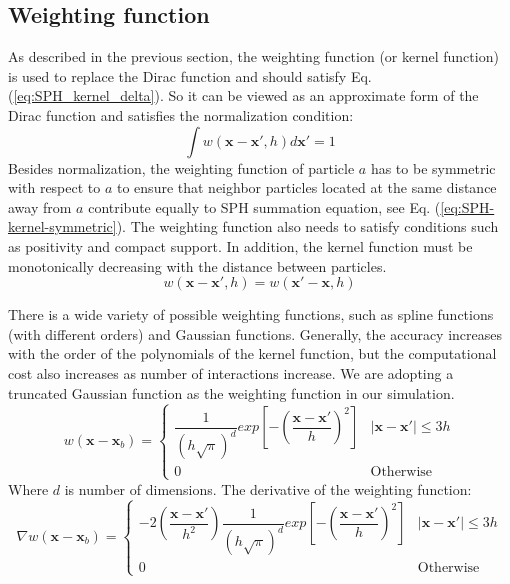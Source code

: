 \documentclass[journal abbreviation, manuscript]{copernicus}
\begin{document}
\subsection{Weighting function}
As described in the previous section, the weighting function (or kernel function) is used to replace the Dirac function and should satisfy Eq.  (\ref{eq:SPH_kernel_delta}). So it can be viewed as an approximate form of the Dirac function and satisfies the normalization condition:
\begin{equation}
\int	 w\left(\textbf{x}-\textbf{x}\prime, h\right) d\textbf{x}\prime = 1
\label{eq:SPH-kernel-normalization-prop}
\end{equation}
Besides normalization, the weighting function of particle $a$ has to be symmetric with respect to $a$ to ensure that neighbor particles located at the same distance away from $a$ contribute equally to SPH summation equation, see Eq. (\ref{eq:SPH-kernel-symmetric}). The weighting function also needs to satisfy conditions such as positivity and compact support. In addition, the kernel function must be monotonically decreasing with the distance between particles.\\
\begin{equation}
w\left(\textbf{x}- \textbf{x} \prime, h\right) = w\left(\textbf{x} \prime - \textbf{x}, h\right)
\label{eq:SPH-kernel-symmetric}
\end{equation}

There is a wide variety of possible weighting functions, such as spline functions (with different orders) and Gaussian functions. Generally, the accuracy increases with the order of the polynomials of the kernel function, but the computational cost also increases as number of interactions increase. 
We are adopting a truncated Gaussian function as the weighting function in our simulation.
\begin{equation}
w\left(\textbf{x} - \textbf{x}_b\right) = 
\begin{cases} 
      \dfrac{1}{\left(h \sqrt{\pi}\right)^d} exp \left[- \left(\dfrac{\textbf{x} - \textbf{x} \prime}{h} \right)^2 \right] &  \vert \textbf{x} - \textbf{x} \prime \vert \leq 3h\\
      0 & \text{Otherwise}
\end{cases}
\label{eq:SPH-kernel}
\end{equation}
Where $d$ is number of dimensions.
The derivative of the weighting function:
\begin{equation}
\nabla w\left(\textbf{x} - \textbf{x}_b\right) = 
\begin{cases} 
      -2\left(\dfrac{\textbf{x} - \textbf{x} \prime}{h^2}\right) \dfrac{1}{\left(h \sqrt{\pi}\right)^d} exp \left[- \left(\dfrac{\textbf{x} - \textbf{x} \prime}{h}\right)^2 \right] &  \vert \textbf{x} - \textbf{x} \prime \vert \leq 3h\\
      0 & \text{Otherwise}
\end{cases}
\end{equation}
\end{document}
